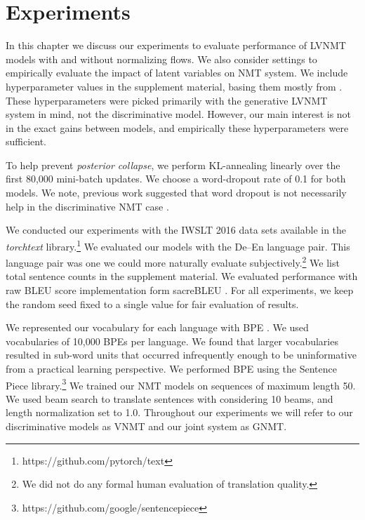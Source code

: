 \chapter{Experiments}

In this chapter we discuss our experiments to evaluate performance of \ac{LVNMT} models with and without normalizing flows. We also consider settings to empirically evaluate the impact of latent variables on \ac{NMT} system. We include hyperparameter values in the supplement material, basing them mostly from \citet{eikema2018AEVNMT}. These hyperparameters were picked primarily with the generative \ac{LVNMT} system in mind, not the discriminative model. However, our main interest is not in the exact gains between models, and empirically these hyperparameters were sufficient.

To help prevent \textit{posterior collapse}, we perform KL-annealing linearly over the first 80,000 mini-batch updates. We choose a word-dropout rate of 0.1 for both models. We note, previous work suggested that word dropout is not necessarily help in the discriminative \ac{NMT} case \cite{harshil2018GNMT}. %

We conducted our experiments with the IWSLT 2016 data sets available in the \textit{torchtext} library.\footnote{https://github.com/pytorch/text} We evaluated our models with the De--En language pair. This language pair was one we could more naturally evaluate subjectively.\footnote{ We did not do any formal human evaluation of translation quality.} We list total sentence counts in the supplement material. We evaluated performance with raw BLEU score implementation form sacreBLEU \cite{post2018SacreBLEU}. For all experiments, we keep the random seed fixed to a single value for fair evaluation of results. %

We represented our vocabulary for each language with \ac{BPE} \cite{sennrich2015NMTRarwordsBPE}. We used vocabularies of 10,000 \ac{BPE}s per language. We found that larger vocabularies resulted in sub-word units that occurred infrequently enough to be uninformative from a practical learning perspective. We performed \ac{BPE} using the Sentence Piece library.\footnote{https://github.com/google/sentencepiece} We trained our \ac{NMT} models on sequences of maximum length 50. We used beam search to translate sentences with considering 10 beams, and length normalization set to 1.0. Throughout our experiments we will refer to our discriminative models as \ac{VNMT} and our joint system as \ac{GNMT}. %


